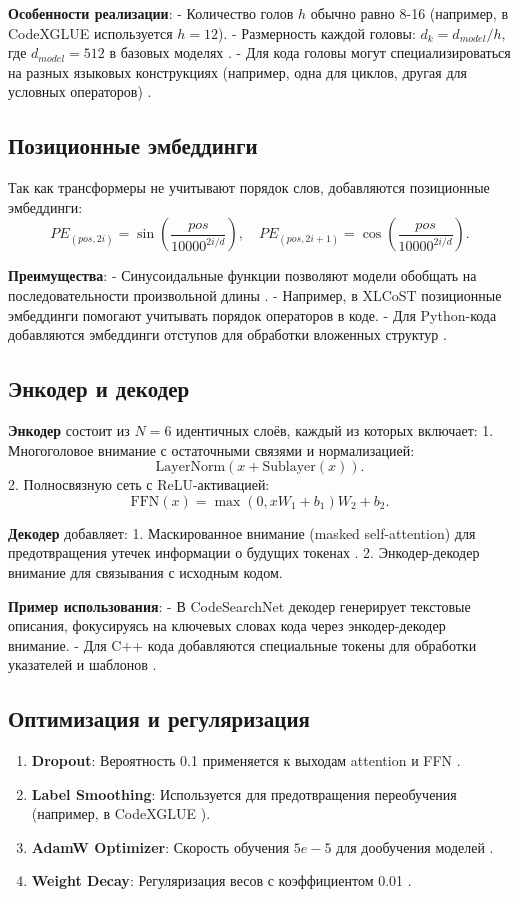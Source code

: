 \documentclass[14pt]{article}
\theoremstyle{definition}
\begin{document}
\textbf{Особенности реализации}:
- Количество голов \(h\) обычно равно 8-16 (например, в CodeXGLUE \cite{lu2021codexglue} используется \(h=12\)).
- Размерность каждой головы: \(d_k = d_{model}/h\), где \(d_{model}=512\) в базовых моделях \cite{lu2021codexglue}.
- Для кода головы могут специализироваться на разных языковых конструкциях (например, одна для циклов, другая для условных операторов) \cite{lu2021codexglue}.

\subsection{Позиционные эмбеддинги}
Так как трансформеры не учитывают порядок слов, добавляются позиционные эмбеддинги:
\[
PE_{(pos, 2i)} = \sin\left(\frac{pos}{10000^{2i/d}}\right), \quad PE_{(pos, 2i+1)} = \cos\left(\frac{pos}{10000^{2i/d}}\right).
\]

\textbf{Преимущества}:
- Синусоидальные функции позволяют модели обобщать на последовательности произвольной длины \cite{zhu2022}.
- Например, в XLCoST \cite{zhu2022} позиционные эмбеддинги помогают учитывать порядок операторов в коде.
- Для Python-кода добавляются эмбеддинги отступов для обработки вложенных структур \cite{ahmad2021plbart}.

\subsection{Энкодер и декодер}
\textbf{Энкодер} состоит из \(N=6\) идентичных слоёв, каждый из которых включает:
1. Многоголовое внимание с остаточными связями и нормализацией:
\[
\text{LayerNorm}(x + \text{Sublayer}(x)).
\]
2. Полносвязную сеть с ReLU-активацией:
\[
\text{FFN}(x) = \max(0, xW_1 + b_1)W_2 + b_2.
\]

\textbf{Декодер} добавляет:
1. Маскированное внимание (masked self-attention) для предотвращения утечек информации о будущих токенах \cite{lu2021codexglue}.
2. Энкодер-декодер внимание для связывания с исходным кодом.

\textbf{Пример использования}:
- В CodeSearchNet \cite{husain2019codesearchnet} декодер генерирует текстовые описания, фокусируясь на ключевых словах кода через энкодер-декодер внимание.
- Для C++ кода добавляются специальные токены для обработки указателей и шаблонов \cite{karampatsis2020big}.

\subsection{Оптимизация и регуляризация}
\begin{enumerate}
    \item \textbf{Dropout}: Вероятность 0.1 применяется к выходам attention и FFN \cite{hu2022lora}.
    \item \textbf{Label Smoothing}: Используется для предотвращения переобучения (например, в CodeXGLUE \cite{lu2021codexglue}).
    \item \textbf{AdamW Optimizer}: Скорость обучения \(5e-5\) для дообучения моделей \cite{liu2022survey}.
    \item \textbf{Weight Decay}: Регуляризация весов с коэффициентом 0.01 \cite{hu2022lora}.
\end{enumerate}
\end{document}
